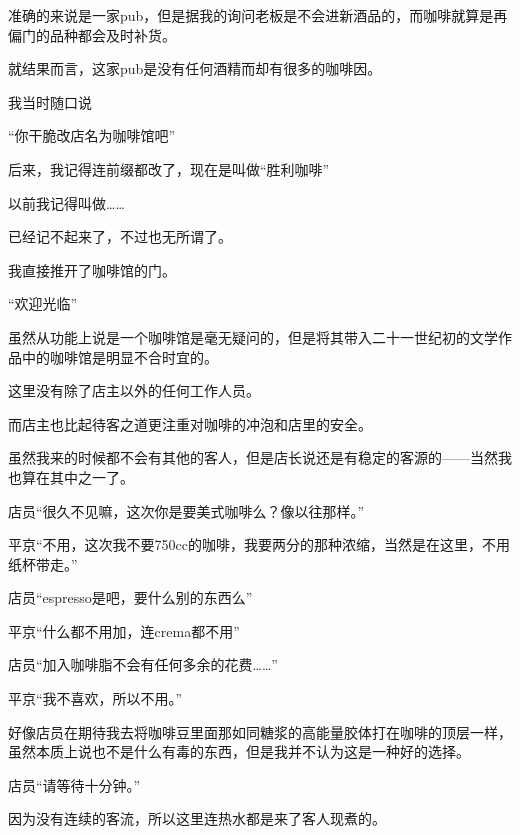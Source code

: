 准确的来说是一家pub，但是据我的询问老板是不会进新酒品的，而咖啡就算是再偏门的品种都会及时补货。

就结果而言，这家pub是没有任何酒精而却有很多的咖啡因。

我当时随口说

“你干脆改店名为咖啡馆吧”

后来，我记得连前缀都改了，现在是叫做“胜利咖啡”

以前我记得叫做……

已经记不起来了，不过也无所谓了。

我直接推开了咖啡馆的门。

“欢迎光临”

虽然从功能上说是一个咖啡馆是毫无疑问的，但是将其带入二十一世纪初的文学作品中的咖啡馆是明显不合时宜的。

这里没有除了店主以外的任何工作人员。

而店主也比起待客之道更注重对咖啡的冲泡和店里的安全。

虽然我来的时候都不会有其他的客人，但是店长说还是有稳定的客源的——当然我也算在其中之一了。

店员“很久不见嘛，这次你是要美式咖啡么？像以往那样。”

平京“不用，这次我不要750cc的咖啡，我要两分的那种浓缩，当然是在这里，不用纸杯带走。”

店员“espresso是吧，要什么别的东西么”

平京“什么都不用加，连crema都不用”

店员“加入咖啡脂不会有任何多余的花费……”

平京“我不喜欢，所以不用。”

好像店员在期待我去将咖啡豆里面那如同糖浆的高能量胶体打在咖啡的顶层一样，虽然本质上说也不是什么有毒的东西，但是我并不认为这是一种好的选择。

店员“请等待十分钟。”

因为没有连续的客流，所以这里连热水都是来了客人现煮的。



